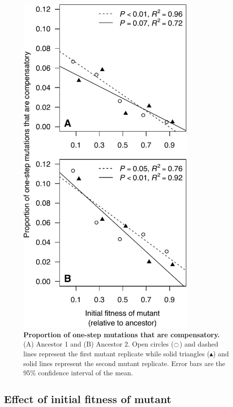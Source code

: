 \begin{doublespace}
\begin{figure}
\begin{center}
\includegraphics[width=3.5in]{comp-avail.pdf}
\end{center}
\caption{{\bf Proportion of one-step mutations that are compensatory.}
  (A) Ancestor 1 and (B) Ancestor 2.
  Open circles ($\ocircle$) and dashed lines
  represent the first mutant replicate
  while solid triangles ($\blacktriangle$) and solid lines
  represent the second mutant replicate.
  Error bars are the 95\% confidence interval of the mean.}
\label{fig:comp_avail}
\end{figure}



\subsection{Effect of initial fitness of mutant}


\end{doublespace}
